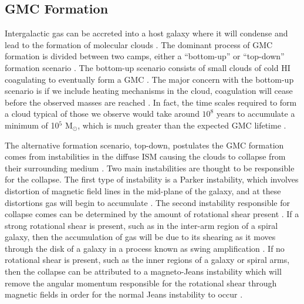 \subsection{GMC Formation}

Intergalactic gas can be accreted into a host galaxy where it will condense and lead to the formation of molecular clouds \citep{kennicutt2012}.  The dominant process of GMC formation is divided between two camps, either a ``bottom-up'' or ``top-down'' formation scenario \citep{mckee2007}.  The bottom-up scenario consists of small clouds of cold HI coagulating to eventually form a GMC \citep{field1965, kwan1979}.  The major concern with the bottom-up scenario is if we include heating mechanisms in the cloud, coagulation will cease before the observed masses are reached \citep{mckee2007}.  In fact, the time scales required to form a cloud typical of those we observe would take around $10^8$ years to accumulate a minimum of 10$^5$ M$_\odot$, which is much greater than the expected GMC lifetime \citep{mckee2007}.  %

The alternative formation scenario, top-down, postulates the GMC formation comes from instabilities in the diffuse ISM causing the clouds to collapse from their surrounding medium \citep{mckee2007}.  Two main instabilities are thought to be responsible for the collapse.  The first type of instability is a Parker instability, which involves distortion of magnetic field lines in the mid-plane of the galaxy, and at these distortions gas will begin to accumulate \citep{parker1966, dobbs2013}.  The second instability responsible for collapse comes can be determined by the amount of rotational shear present \citep{mckee2007}.  If a strong rotational shear is present, such as in the inter-arm region of a spiral galaxy, then the accumulation of gas will be due to its shearing as it moves through the disk of a galaxy in a process known as swing amplification \citep{mckee2007, dobbs2013}.  If no rotational shear is present, such as the inner regions of a galaxy or spiral arms, then the collapse can be attributed to a magneto-Jeans instability which will remove the angular momentum responsible for the rotational shear through magnetic fields in order for the normal Jeans instability to occur \citep{elmegreen1987,kim2001}.

